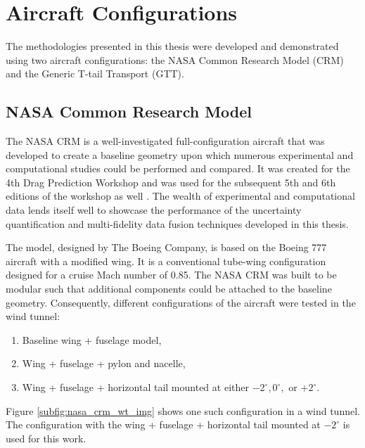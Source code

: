 \section{Aircraft Configurations}

The methodologies presented in this thesis were developed and demonstrated using two aircraft configurations: the NASA Common Research Model (CRM) and the Generic T-tail Transport (GTT). 

\subsection{NASA Common Research Model}
The NASA CRM is a well-investigated full-configuration aircraft \cite{rivers_further_2012,rivers_experimental_2010} that was developed to create a baseline geometry upon which numerous experimental and computational studies could be performed and compared.
It was created for the 4th Drag Prediction Workshop \cite{morrison20094th} and was used for the subsequent 5th and 6th editions of the workshop as well \cite{levy2013summary,morrison20166th,roy2017summary,tinoco2017summary}.
The wealth of experimental and computational data lends itself well to showcase the performance of the uncertainty quantification and multi-fidelity data fusion techniques developed in this thesis.

The model, designed by The Boeing Company, is based on the Boeing 777 aircraft with a modified wing. 
It is a conventional tube-wing configuration designed for a cruise Mach number of 0.85.
The NASA CRM was built to be modular such that additional components could be attached to the baseline geometry. 
Consequently, different configurations of the aircraft were tested in the wind tunnel:
\begin{enumerate}
    \item Baseline wing + fuselage model,
    \item Wing + fuselage + pylon and nacelle,
    \item Wing + fuselage + horizontal tail mounted at either $-2^\circ, 0^\circ,$ or $+2^\circ$.
\end{enumerate}
Figure \ref{subfig:nasa_crm_wt_img} shows one such configuration in a wind tunnel. 
The configuration with the wing + fuselage + horizontal tail mounted at $-2^\circ$ is used for this work.



